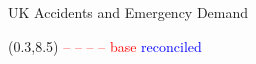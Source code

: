 \documentclass[14pt]{beamer}
\begin{document}


\begin{frame}{\large UK Accidents and Emergency Demand}

\begin{textblock}{12}(0.3,8.5)
\textcolor{red}{-- -- -- -- base} \hspace*{1cm}
\textcolor{blue}{\raisebox{0.5ex}{\rule{1.5cm}{1pt}} reconciled}
\end{textblock}
\end{frame}
\end{document}
